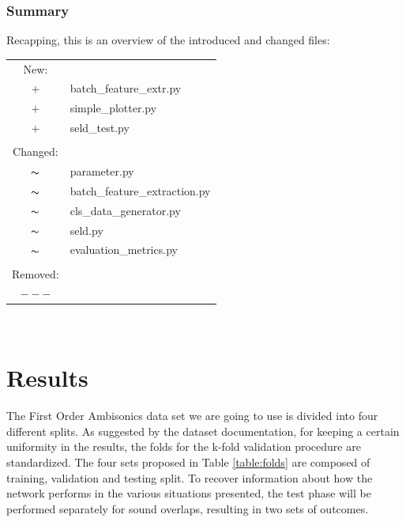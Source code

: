 \documentclass[11pt]{article}
\begin{document}
\subsubsection{Summary}

Recapping, this is an overview of the introduced and changed files:

\begin{tabular}{cp{}}
  New:\\  
  $+$ & batch\_feature\_extr.py \\
  $+$ & simple\_plotter.py \\
  $+$ & seld\_test.py \\
  \\
  Changed:\\
  $\thicksim$ & parameter.py\\
  $\thicksim$ & batch\_feature\_extraction.py\\
  $\thicksim$ & cls\_data\_generator.py\\
  $\thicksim$ & seld.py\\
  $\thicksim$ & evaluation\_metrics.py\\
  \\
  Removed:\\
  $---$ 
\end{tabular}\\


\newpage
\section{Results}\label{cha:res}

The First Order Ambisonics data set we are going to use is divided into four different splits. As suggested by the dataset documentation, for keeping a certain uniformity in the results, the folds for the k-fold validation procedure are standardized. The four sets proposed in Table \ref{table:folds} are composed of training, validation and testing split.  
To recover information about how the network performs in the various situations presented, the test phase will be performed separately for sound overlaps, resulting in two sets of outcomes.
\end{document}
